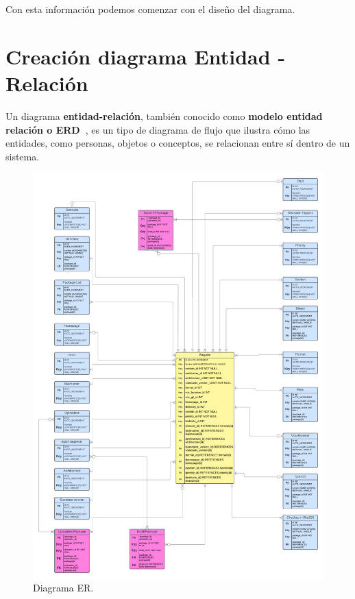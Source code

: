 \documentclass[a4paper, 12pt]{book}
\begin{document}
Con esta información podemos comenzar con el diseño del diagrama.



\section{Creación diagrama Entidad - Relación} 
\label{sec:diagrama_entidad_relacion}
Un diagrama \textbf {entidad-relación}, también conocido como \textbf {modelo entidad relación o ERD~\cite{lucidchart:_diagramaERD}}, es un tipo de diagrama de flujo que ilustra cómo las entidades, como personas, objetos o conceptos, se relacionan entre sí dentro de un sistema.

\begin{figure}
	\centering
	\includegraphics[width=17cm, keepaspectratio]{img/Diagrama_ER.png}
	\caption{Diagrama ER.}
	\label{fig:entidad_relación}
\end{figure}
\end{document}
